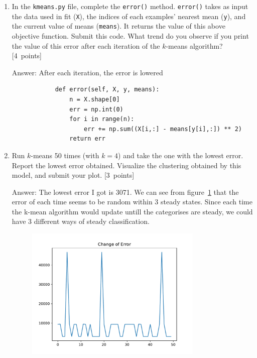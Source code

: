 \documentclass{article}
\newcommand{\blu}[1]{{\textcolor{blu}{#1}}}
\newenvironment{answer}{\par\begingroup\color{gre}Answer: }{\endgroup}
\let\ask\blu
\newcommand\pts[1]{\textcolor{pointscolour}{[#1~points]}}
\begin{document}
    \begin{enumerate}
        \item In the \texttt{kmeans.py} file, complete the \texttt{error()} method. \texttt{error()} takes as input the data used in fit (\texttt{X}), the indices of each examples' nearest mean (\texttt{y}), and the current value of means (\texttt{means}). It returns the value of this above objective function. \ask{Submit this code. What trend do you observe if you print the value of this error after each iteration of the $k$-means algorithm?} \pts{4}
        \begin{answer}
            After each iteration, the error is lowered
        \end{answer}
        \begin{verbatim}
            def error(self, X, y, means):
                n = X.shape[0]
                err = np.int(0)
                for i in range(n):
                    err += np.sum((X[i,:] - means[y[i],:]) ** 2)
                return err
        \end{verbatim}
        \item Run $k$-means 50 times (with $k=4$) and take the one with the lowest error. \ask{Report the lowest error obtained.} Visualize the clustering obtained by this model, and \ask{submit your plot}. \pts{3}
        \begin{answer}
            The lowest error I got is 3071. We can see from figure~\ref{fig5.1.2} that the error of each time seems to be random within 3 steady states. Since each time the k-mean algorithm would update untill the categorises are steady, we could have 3 different ways of steady classification. 
        \end{answer}
        \begin{figure}
            \centering\label{fig5.1.2}
            \includegraphics[width = 0.8\textwidth]{figs/kmeans_error.pdf}
        \end{figure}
    \end{enumerate}
\end{document}
